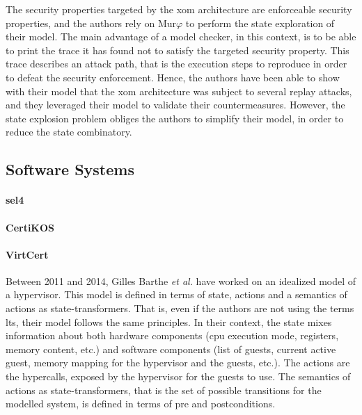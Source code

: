 The security properties targeted by the \ac{xom} architecture are enforceable
security properties, and the authors rely on Mur$\varphi$ to perform the state
exploration of their model.
%
The main advantage of a model checker, in this context, is to be able to print
the trace it has found not to satisfy the targeted security property.
%
This trace describes an attack path, that is the execution steps to reproduce in
order to defeat the security enforcement.
%
Hence, the authors have been able to show with their model that the \ac{xom}
architecture was subject to several replay attacks, and they leveraged their
model to validate their countermeasures.
%
However, the state explosion problem obliges the authors to simplify their
model, in order to reduce the state combinatory.

\subsection{Software Systems}

\paragraph{sel4}

\paragraph{CertiKOS}

\paragraph{VirtCert}
%
Between 2011 and 2014, Gilles Barthe \emph{et al.} have worked on an idealized
model of a hypervisor.
%
This model is defined in terms of state, actions and a semantics of actions as
state-transformers.
%
That is, even if the authors are not using the terms \ac{lts}, their model
follows the same principles.
%
In their context, the state mixes information about both hardware components
(\ac{cpu} execution mode, registers, memory content, etc.) and software
components (list of guests, current active guest, memory mapping for the
hypervisor and the guests, etc.).
%
The actions are the hypercalls, exposed by the hypervisor for the guests to use.
%
The semantics of actions as state-transformers, that is the set of possible
transitions for the modelled system, is defined in terms of pre and
postconditions.

